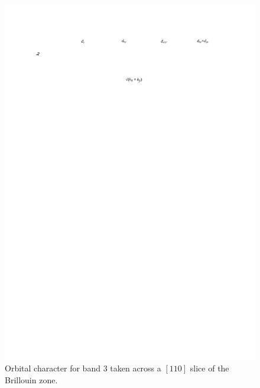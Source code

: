 \begin{figure}[h!]
    \begin{center}
        \includegraphics[scale=0.7]{Chapter-dHvABaFe2P2/Figures/AngleDepMeasurements/BandCharacterPlot/Band3_110Slice_BandCharacter}
        \caption{Orbital character for band 3 taken across a $[110]$ slice of the Brillouin zone.}
        \label{Fig:Appendix:BandCharacter110Band3}
    \end{center}
\end{figure}
